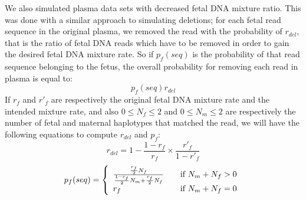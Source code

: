 	We also simulated plasma data sets with decreased fetal DNA mixture ratio. This was done with a similar approach to simulating deletions; for each fetal read sequence in the original plasma, we removed the read with the probability of $r_{del}$, that is the ratio of fetal DNA reads which have to be removed in order to gain the desired fetal DNA mixture rate. So if $p_f(seq)$ is the probability of that read sequence belonging to the fetus, the overall probability for removing each read in plasma is equal to:
	 $$p_f(seq)r_{del}$$
	 If $r_f$ and $r'_f$ are respectively the original fetal DNA mixture rate and the intended mixture rate, and also $0 \leq N_f \leq 2$ and $0 \leq N_m \leq 2$ are respectively the number of fetal and maternal haplotypes that matched the read, we will have the following equations to compute $r_{del}$ and $p_f$:
	 $$r_{del}= 1 - \frac{1 - r_f } { r_f} \times \frac{r'_f}{1-r'_f}$$
	$$ p_f(seq) = \left\{ 
  \begin{array}{l l}
    \frac{ \frac{r_f}{2}N_f } { \frac{1-r_f}{2} N_m + \frac{r_f}{2} N_f} & \quad \text{if $N_m+N_f>0$}\\
    r_f & \quad \text{if $N_m+N_f=0$}
  \end{array} \right.$$	 
